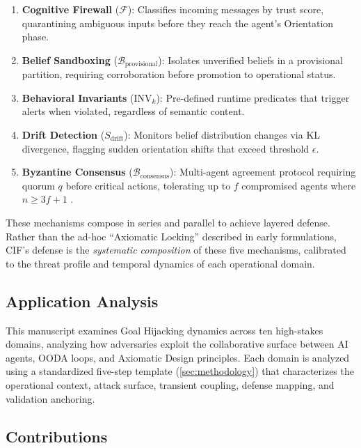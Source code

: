 \documentclass[
]{article}
\providecommand{\tightlist}{%
  \setlength{\itemsep}{0pt}\setlength{\parskip}{0pt}}
\begin{document}
\begin{enumerate}
\def\labelenumi{\arabic{enumi}.}
\tightlist
\item
  \textbf{Cognitive Firewall} (\(\mathcal{F}\)): Classifies incoming
  messages by trust score, quarantining ambiguous inputs before they
  reach the agent's Orientation phase.
\item
  \textbf{Belief Sandboxing} (\(\mathcal{B}_{\text{provisional}}\)):
  Isolates unverified beliefs in a provisional partition, requiring
  corroboration before promotion to operational status.
\item
  \textbf{Behavioral Invariants} (\(\text{INV}_k\)): Pre-defined runtime
  predicates that trigger alerts when violated, regardless of semantic
  content.
\item
  \textbf{Drift Detection} (\(S_{\text{drift}}\)): Monitors belief
  distribution changes via KL divergence, flagging sudden orientation
  shifts that exceed threshold \(\epsilon\).
\item
  \textbf{Byzantine Consensus} (\(\mathcal{B}_{\text{consensus}}\)):
  Multi-agent agreement protocol requiring quorum \(q\) before critical
  actions, tolerating up to \(f\) compromised agents where
  \(n \geq 3f+1\) \cite{lamport1982byzantine}.
\end{enumerate}

These mechanisms compose in series and parallel to achieve layered
defense. Rather than the ad-hoc ``Axiomatic Locking'' described in early
formulations, CIF's defense is the \emph{systematic composition} of
these five mechanisms, calibrated to the threat profile and temporal
dynamics of each operational domain.

\subsection{Application Analysis}\label{application-analysis}

This manuscript examines Goal Hijacking dynamics across ten high-stakes
domains, analyzing how adversaries exploit the collaborative surface
between AI agents, OODA loops, and Axiomatic Design principles. Each
domain is analyzed using a standardized five-step template
(\cref{sec:methodology}) that characterizes the operational context,
attack surface, transient coupling, defense mapping, and validation
anchoring.

\subsection{Contributions}\label{contributions}
\end{document}
